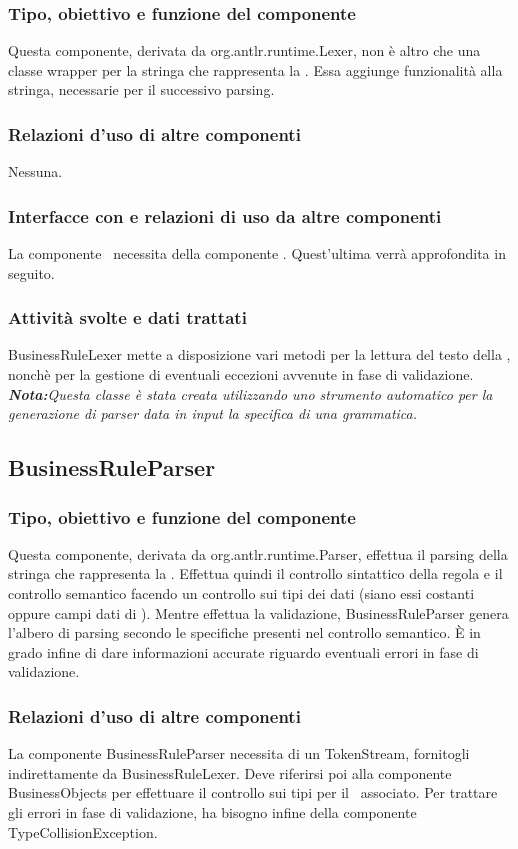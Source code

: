 \subsubsection{Tipo, obiettivo e funzione del componente}
Questa componente, derivata da org.antlr.runtime.Lexer, non \`e altro che una classe wrapper per la stringa che rappresenta la \br. Essa aggiunge funzionalit\`a alla stringa, necessarie per il successivo parsing.
\subsubsection{Relazioni d'uso di altre componenti}
Nessuna.
\subsubsection{Interfacce con e relazioni di uso da altre componenti}
La componente \brp\ necessita della componente \brl. Quest'ultima verr\`a approfondita in seguito.
\subsubsection{Attivit\`a svolte e dati trattati}
BusinessRuleLexer mette a disposizione vari metodi per la lettura del testo della \br, nonch\`e per la gestione di eventuali eccezioni avvenute in fase di validazione.\\
\textit{\textbf{Nota:}Questa classe \`e stata creata utilizzando uno strumento automatico per la generazione di parser data in input la specifica di una grammatica.}

\subsection{BusinessRuleParser}
\subsubsection{Tipo, obiettivo e funzione del componente}
Questa componente, derivata da org.antlr.runtime.Parser, effettua il parsing della stringa che rappresenta la \br. Effettua quindi il controllo sintattico della regola e il controllo semantico facendo un controllo sui tipi dei dati (siano essi costanti oppure campi dati di \bos). Mentre effettua la validazione, BusinessRuleParser genera l'albero di parsing secondo le specifiche presenti nel controllo semantico. \`E in grado infine di dare informazioni accurate riguardo eventuali errori in fase di validazione.
\subsubsection{Relazioni d'uso di altre componenti}
La componente BusinessRuleParser necessita di un TokenStream, fornitogli indirettamente da BusinessRuleLexer. Deve riferirsi poi alla componente BusinessObjects per effettuare il controllo sui tipi per il \bo\ associato. Per trattare gli errori in fase di validazione, ha bisogno infine della componente TypeCollisionException.
